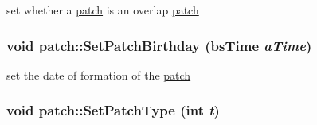 set whether a \hyperlink{classpatch}{patch} is an overlap \hyperlink{classpatch}{patch} \hypertarget{classpatch_a9c53399ac48828cacb0fa4071952d9d4}{
\subsubsection[{SetPatchBirthday}]{\setlength{\rightskip}{0pt plus 5cm}void patch::SetPatchBirthday ({\bf bsTime} {\em aTime})}}
\label{classpatch_a9c53399ac48828cacb0fa4071952d9d4}


set the date of formation of the \hyperlink{classpatch}{patch} \hypertarget{classpatch_aed1dc764e72357aafb106b81fec5e703}{
\subsubsection[{SetPatchType}]{\setlength{\rightskip}{0pt plus 5cm}void patch::SetPatchType (int {\em t})}}
\label{classpatch_aed1dc764e72357aafb106b81fec5e703}


